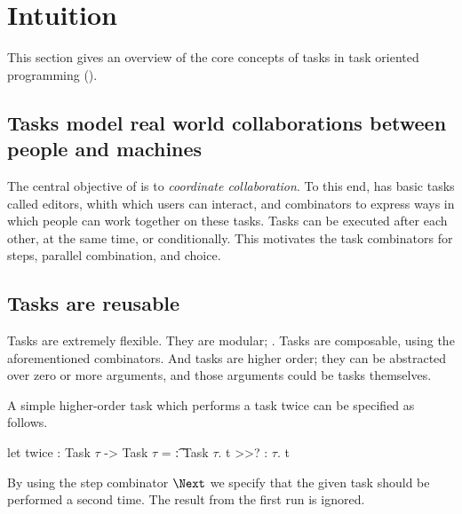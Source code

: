 


\section{Intuition}
\label{sec:intuition}

This section gives an overview of the core concepts of tasks in task oriented
programming (\TOP).



\subsection{Tasks model real world collaborations between people and machines}

The central objective of \TOP is to \emph{coordinate collaboration}.
To this end, \TOPHAT has basic tasks called editors, whith which users can
interact, and combinators to express ways in which people can work together on
these tasks. Tasks can be executed after each other, at the same time, or
conditionally. This motivates the task combinators for steps, parallel
combination, and choice.



\subsection{Tasks are reusable}

Tasks are extremely flexible. They are modular; . Tasks are
composable, using the aforementioned combinators. And tasks are higher order;
they can be abstracted over zero or more arguments, and those arguments could
be tasks themselves.

\begin{example}[Twice]

A simple higher-order task which performs a task twice can be specified as
follows.
\begin{TASK}
  let twice : Task $\tau$ -> Task $\tau$ = \t : Task $\tau$. t >>? \x : $\tau$. t
\end{TASK}
By using the step combinator $\Next$ we specify that the given task 
should be performed a second time. The result  from the first run is
ignored.

\end{example}


